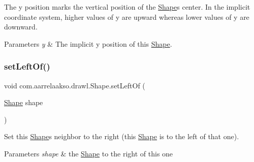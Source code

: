 The y position marks the vertical position of the \hyperlink{classcom_1_1aarrelaakso_1_1drawl_1_1_shape}{Shape}\textquotesingle{}s center. In the implicit coordinate system, higher values of y are upward whereas lower values of y are downward.


\begin{DoxyParams}{Parameters}
{\em y} & The implicit y position of this \hyperlink{classcom_1_1aarrelaakso_1_1drawl_1_1_shape}{Shape}. \\
\hline
\end{DoxyParams}
\mbox{\label{classcom_1_1aarrelaakso_1_1drawl_1_1_shape_aad14fa860ab74cfa90815f56cf4c3ecf}} 
\subsubsection{\texorpdfstring{set\+Left\+Of()}{setLeftOf()}}
{\footnotesize\ttfamily void com.\+aarrelaakso.\+drawl.\+Shape.\+set\+Left\+Of (\begin{DoxyParamCaption}\item[{\hyperlink{classcom_1_1aarrelaakso_1_1drawl_1_1_shape}{Shape}}]{shape }\end{DoxyParamCaption})\hspace{0.3cm}{\ttfamily [inherited]}}

Set this \hyperlink{classcom_1_1aarrelaakso_1_1drawl_1_1_shape}{Shape}\textquotesingle{}s neighbor to the right (this \hyperlink{classcom_1_1aarrelaakso_1_1drawl_1_1_shape}{Shape} is to the left of that one).


\begin{DoxyParams}{Parameters}
{\em shape} & the \hyperlink{classcom_1_1aarrelaakso_1_1drawl_1_1_shape}{Shape} to the right of this one \\
\hline
\end{DoxyParams}
\mbox{\label{classcom_1_1aarrelaakso_1_1drawl_1_1_shape_a09e1586ce85c1d964cc3b7ce94bc5d4c}} 
